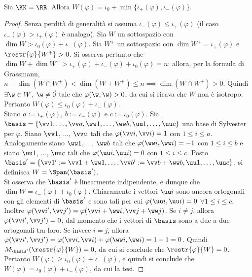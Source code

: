 \begin{proposition}
	Sia $\KK = \RR$. Allora
	$W(\varphi) = \iota_0 + \min\{\iota_+(\varphi), \iota_-(\varphi)\}$.
\end{proposition}

\begin{proof}
	Senza perdità di generalità si assuma $\iota_-(\varphi) \leq \iota_+(\varphi)$ (il caso $\iota_-(\varphi) > \iota_+(\varphi)$ è analogo). Sia $W$ un sottospazio con $\dim W > \iota_0(\varphi) + \iota_-(\varphi)$. Sia $W^+$
	un sottospazio con $\dim W^+ = \iota_+(\varphi)$ e $\restr{\varphi}{W^+} > 0$. Si
	osserva pertanto che $\dim W + \dim W^+ > \iota_+(\varphi) + \iota_-(\varphi) + \iota_0(\varphi) = n$: allora, per la formula
	di Grassmann, $n - \dim(W \cap W^+) < \dim (W + W^+) \leq n \implies \dim (W \cap W^+) > 0$. Quindi $\exists \w \in W$, $\w \neq \vec 0$ tale che $\varphi(\w, \w) > 0$, da cui
	si ricava che $W$ non è isotropo. Pertanto $W(\varphi) \leq \iota_0(\varphi) + \iota_-(\varphi)$. \\
	
	Siano $a := \iota_+(\varphi)$, $b := \iota_-(\varphi)$ e $c := \iota_0(\varphi)$.
	Sia $\basis = \{ \vv 1, \ldots, \vv a, \ww 1, \ldots, \ww b, \uu 1, \ldots, \uu c \}$ una base di Sylvester per $\varphi$. Siano $\vv 1$, ..., $\vv a$ tali che $\varphi(\vv i, \vv i) = 1$
	con $1 \leq i \leq a$. Analogamente siano $\ww 1$, ..., $\ww b$ tali che $\varphi(\ww i, \ww i) = -1$ con
	$1 \leq i \leq b$ e siano $\uu 1$, ..., $\uu c$ tali che $\varphi(\uu i, \uu i) = 0$ con
	$1 \leq i \leq c$. Posto $\basis' = \{ \vv 1 ' := \vv 1 + \ww 1, \ldots, \vv b ' := \vv b + \ww b, \uu 1, \ldots, \uu c \}$, si definisca $W = \Span(\basis')$. \\
	
	Si osserva che $\basis'$ è linearmente indipendente, e dunque che $\dim W = \iota_-(\varphi) + \iota_0(\varphi)$. Chiaramente i vettori $\uu i$ sono ancora ortogonali con gli elementi di $\basis'$ e sono tali per cui $\varphi(\uu i, \uu i) = 0$ $\forall 1 \leq i \leq c$. Inoltre
	$\varphi(\vv i ', \vv j ') = \varphi(\vv i + \ww i, \vv j + \ww j)$. Se $i \neq j$, allora
	$\varphi(\vv i ', \vv j ') = 0$, dal momento che i vettori di $\basis$ sono a due a due ortogonali
	tra loro. Se invece $i = j$, allora $\varphi(\vv i ', \vv j ') = \varphi(\vv i, \vv i) + \varphi(\ww i, \ww i) = 1-1=0$. Quindi $M_{\basis'}(\restr{\varphi}{W}) = 0$, da cui si conclude che $\restr{\varphi}{W} = 0$.
	Pertanto $W(\varphi) \geq \iota_0(\varphi) + \iota_-(\varphi)$, e quindi si conclude che $W(\varphi) = \iota_0(\varphi) + \iota_-(\varphi)$, da cui la tesi.
\end{proof}

